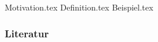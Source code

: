 \documentclass[aspectratio=\BeamerAspectRatio]{beamer}
\begin{document}
\maketitlepage %
\makesectionpopup %

{Motivation.tex}
{Definition.tex}
{Beispiel.tex}

\begin{frame}[allowframebreaks]
    \frametitle{Literatur}
    \printbibliography
\end{frame}
\end{document}
